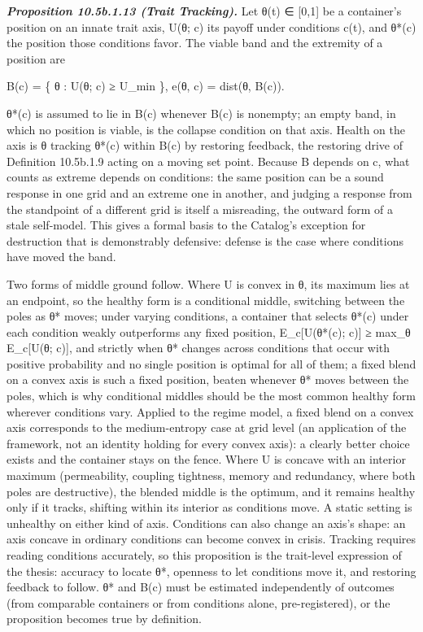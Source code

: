 \documentclass[
]{article}
\begin{document}
\emph{\textbf{Proposition 10.5b.1.13 (Trait Tracking).}} Let θ(t) ∈
{[}0,1{]} be a container's position on an innate trait axis, U(θ; c) its
payoff under conditions c(t), and θ*(c) the position those conditions
favor. The viable band and the extremity of a position are

B(c) = \{ θ : U(θ; c) ≥ U\_min \}, e(θ, c) = dist(θ, B(c)).

θ*(c) is assumed to lie in B(c) whenever B(c) is nonempty; an empty
band, in which no position is viable, is the collapse condition on that
axis. Health on the axis is θ tracking θ*(c) within B(c) by restoring
feedback, the restoring drive of Definition 10.5b.1.9 acting on a moving
set point. Because B depends on c, what counts as extreme depends on
conditions: the same position can be a sound response in one grid and an
extreme one in another, and judging a response from the standpoint of a
different grid is itself a misreading, the outward form of a stale
self-model. This gives a formal basis to the Catalog's exception for
destruction that is demonstrably defensive: defense is the case where
conditions have moved the band.

Two forms of middle ground follow. Where U is convex in θ, its maximum
lies at an endpoint, so the healthy form is a conditional middle,
switching between the poles as θ* moves; under varying conditions, a
container that selects θ*(c) under each condition weakly outperforms any
fixed position, E\_c{[}U(θ*(c); c){]} ≥ max\_θ E\_c{[}U(θ; c){]}, and
strictly when θ* changes across conditions that occur with positive
probability and no single position is optimal for all of them; a fixed
blend on a convex axis is such a fixed position, beaten whenever θ*
moves between the poles, which is why conditional middles should be the
most common healthy form wherever conditions vary. Applied to the regime
model, a fixed blend on a convex axis corresponds to the medium-entropy
case at grid level (an application of the framework, not an identity
holding for every convex axis): a clearly better choice exists and the
container stays on the fence. Where U is concave with an interior
maximum (permeability, coupling tightness, memory and redundancy, where
both poles are destructive), the blended middle is the optimum, and it
remains healthy only if it tracks, shifting within its interior as
conditions move. A static setting is unhealthy on either kind of axis.
Conditions can also change an axis's shape: an axis concave in ordinary
conditions can become convex in crisis. Tracking requires reading
conditions accurately, so this proposition is the trait-level expression
of the thesis: accuracy to locate θ*, openness to let conditions move
it, and restoring feedback to follow. θ* and B(c) must be estimated
independently of outcomes (from comparable containers or from conditions
alone, pre-registered), or the proposition becomes true by definition.
\end{document}
